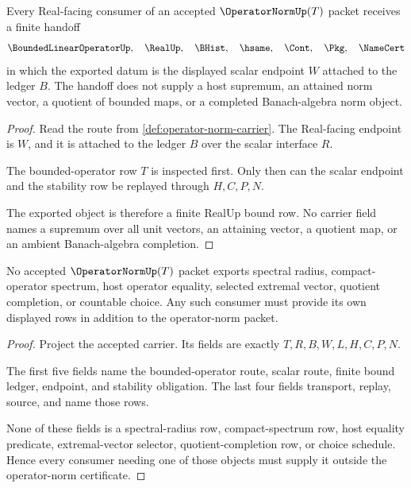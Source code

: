 \begin{theorem}
\label{thm:operator-norm-real-bound-handoff}
Every Real-facing consumer of an accepted $\OperatorNormUp(T)$ packet receives a finite handoff
$$
\BoundedLinearOperatorUp,\quad \RealUp,\quad \BHist,\quad \hsame,\quad \Cont,\quad \Pkg,\quad \NameCert
$$
in which the exported datum is the displayed scalar endpoint $W$ attached to the ledger $B$. The handoff does not supply a host supremum, an attained norm vector, a quotient of bounded maps, or a completed Banach-algebra norm object.
\end{theorem}
\begin{proof}
Read the route from \autoref{def:operator-norm-carrier}. The Real-facing endpoint is $W$, and it is attached to the ledger $B$ over the scalar interface $R$.

The bounded-operator row $T$ is inspected first. Only then can the scalar endpoint and the stability row be replayed through $H,C,P,N$.

The exported object is therefore a finite RealUp bound row. No carrier field names a supremum over all unit vectors, an attaining vector, a quotient map, or an ambient Banach-algebra completion.
\end{proof}

\begin{theorem}
\label{thm:operator-norm-nonescape}
No accepted $\OperatorNormUp(T)$ packet exports spectral radius, compact-operator spectrum, host operator equality, selected extremal vector, quotient completion, or countable choice. Any such consumer must provide its own displayed rows in addition to the operator-norm packet.
\end{theorem}
\begin{proof}
Project the accepted carrier. Its fields are exactly $T,R,B,W,L,H,C,P,N$.

The first five fields name the bounded-operator route, scalar route, finite bound ledger, endpoint, and stability obligation. The last four fields transport, replay, source, and name those rows.

None of these fields is a spectral-radius row, compact-spectrum row, host equality predicate, extremal-vector selector, quotient-completion row, or choice schedule. Hence every consumer needing one of those objects must supply it outside the operator-norm certificate.
\end{proof}


